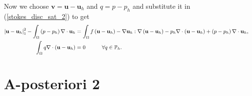 \documentclass[12pt,a4paper]{article}
\theoremstyle{definition}
\begin{document}
Now we choose $\textbf{v}=\textbf{u}-\textbf{u}_h$ and $q=p-p_h$ and substitute it in (\ref{stokes_disc_sat_2}) to get
\begin{eqnarray}\small
\begin{aligned}
\left|\textbf{u}-\textbf{u}_h\right|^2_{1}-\int_{\Omega}\left(p-p_h\right)\nabla\cdot\textbf{u}_h&=\int_{\Omega}f\left(\textbf{u}-\textbf{u}_h\right) -\nabla\textbf{u}_h:\nabla\left(\textbf{u}-\textbf{u}_h\right)-p_h\nabla\cdot\left(\textbf{u}-\textbf{u}_h\right)+\left(p-p_h\right)\nabla\cdot\textbf{u}_h, \\
\int_{\Omega}q\nabla\cdot\left(\textbf{u}-\textbf{u}_h\right)&=0\quad \quad\quad\forall q \in\mathbb{P}_h.
\end{aligned}
\end{eqnarray}
\section{A-posteriori 2}
\end{document}
